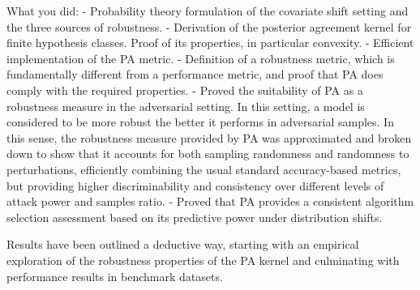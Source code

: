 What you did:
- Probability theory formulation of the covariate shift setting and the three sources of robustness.
- Derivation of the posterior agreement kernel for finite hypothesis classes. Proof of its properties, in particular convexity.
- Efficient implementation of the PA metric.
- Definition of a robustness metric, which is fundamentally different from a performance metric, and proof that PA
does comply with the required properties.
- Proved the suitability of PA as a robustness measure in the adversarial setting. In this setting, a model is considered to
be more robust the better it performs in adversarial samples. In this sense, the robustness measure provided by PA was approximated
and broken down to show that it accounts for both sampling randomness and randomness to perturbations, efficiently combining
the usual standard accuracy-based metrics, but providing higher discriminability and consistency over different levels of
attack power and samples ratio.
- Proved that PA provides a consistent algorithm selection assessment based on its predictive power under distribution shifts.


Results have been outlined a deductive way, starting with an 
empirical exploration of the robustness properties of the PA kernel and culminating
with performance results in benchmark datasets.

\cleardoublepage
